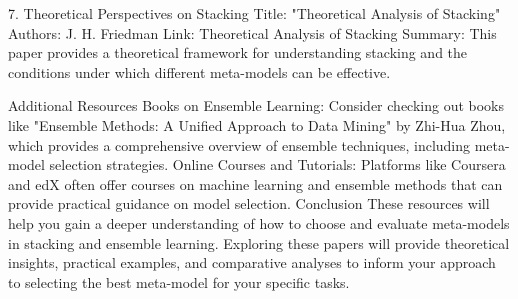 7. Theoretical Perspectives on Stacking
Title: "Theoretical Analysis of Stacking"
Authors: J. H. Friedman
Link: Theoretical Analysis of Stacking
Summary: This paper provides a theoretical framework for understanding stacking and the conditions under which different meta-models can be effective.


Additional Resources
Books on Ensemble Learning: Consider checking out books like "Ensemble Methods: A Unified Approach to Data Mining" by Zhi-Hua Zhou, which provides a comprehensive overview of ensemble techniques, including meta-model selection strategies.
Online Courses and Tutorials: Platforms like Coursera and edX often offer courses on machine learning and ensemble methods that can provide practical guidance on model selection.
Conclusion
These resources will help you gain a deeper understanding of how to choose and evaluate meta-models in stacking and ensemble learning. Exploring these papers will provide theoretical insights, practical examples, and comparative analyses to inform your approach to selecting the best meta-model for your specific tasks.